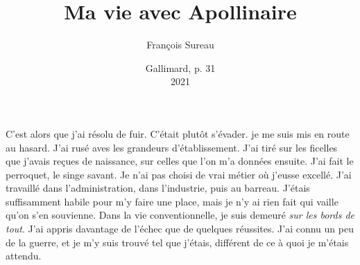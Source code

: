 \documentclass{article}
\title{Ma vie avec Apollinaire}
\date{Gallimard, p. 31\\2021}
\author{François Sureau}
\begin{document}
\maketitle


C'est alors que j'ai résolu de fuir. C'était plutôt
s'évader. je me suis mis en route au hasard. J'ai rusé aves
les grandeurs d'établissement. J'ai tiré sur les ficelles
que j'avais reçues de naissance, sur celles que l'on m'a
données ensuite. J'ai fait le perroquet, le singe savant. Je
n'ai pas choisi de vrai métier où j'eusse excellé. J'ai
travaillé dans l'administration, dans l'industrie, puis au
barreau. J'étais suffisamment habile pour m'y faire une
place, mais je n'y ai rien fait qui vaille qu'on s'en
souvienne. Dans la vie conventionnelle, je suis demeuré \emph{sur
les bords de tout}. J'ai appris davantage de l'échec que de
quelques réussites. J'ai connu un peu de la guerre, et je
m'y suis trouvé tel que j'étais, différent de ce à quoi je
m'étais attendu.
\end{document}
